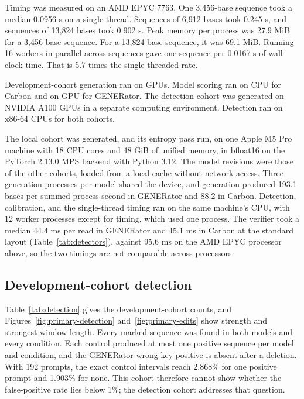 \documentclass[10pt,twocolumn]{article}
\begin{document}
Timing was measured on an AMD EPYC 7763. One 3{,}456-base sequence took a median 0.0956 s on a single
thread. Sequences of 6{,}912 bases took 0.245 s, and sequences of 13{,}824 bases took 0.902 s. Peak memory
per process was 27.9 MiB for a 3{,}456-base sequence. For a 13{,}824-base sequence, it was 69.1 MiB.
Running 16 workers in parallel across sequences gave one sequence per 0.0167 s of wall-clock time. That is
5.7 times the single-threaded rate.

Development-cohort generation ran on GPUs. Model scoring ran on CPU for Carbon and on GPU for
GENERator. The detection cohort was generated on NVIDIA A100 GPUs in a separate computing
environment. Detection ran on x86-64 CPUs for both cohorts.

The local cohort was generated, and its entropy pass run, on one Apple M5 Pro machine with 18 CPU
cores and 48 GiB of unified memory, in bfloat16 on the PyTorch 2.13.0 MPS backend with Python 3.12.
The model revisions were those of the other cohorts, loaded from a local cache without network
access. Three generation processes per model shared the device, and generation produced 193.1 bases
per summed process-second in GENERator and 88.2 in Carbon. Detection, calibration, and the
single-thread timing ran on the same machine's CPU, with 12 worker processes except for timing, which
used one process. The verifier took a median 44.4 ms per read in GENERator and 45.1 ms in Carbon at
the standard layout (Table~\ref{tab:detectors}), against 95.6 ms on the AMD EPYC processor above, so
the two timings are not comparable across processors.

\subsection{Development-cohort detection}
\label{supp:development}

Table~\ref{tab:detection} gives the development-cohort counts, and
Figures~\ref{fig:primary-detection} and~\ref{fig:primary-edits} show strength and strongest-window
length. Every marked sequence was found in both models and every condition. Each control produced at
most one positive sequence per model and condition, and the GENERator wrong-key positive is absent
after a deletion. With 192 prompts, the exact control intervals reach 2.868\% for one positive
prompt and 1.903\% for none. This cohort therefore cannot show whether the false-positive rate lies
below 1\%; the detection cohort addresses that question.
\end{document}
